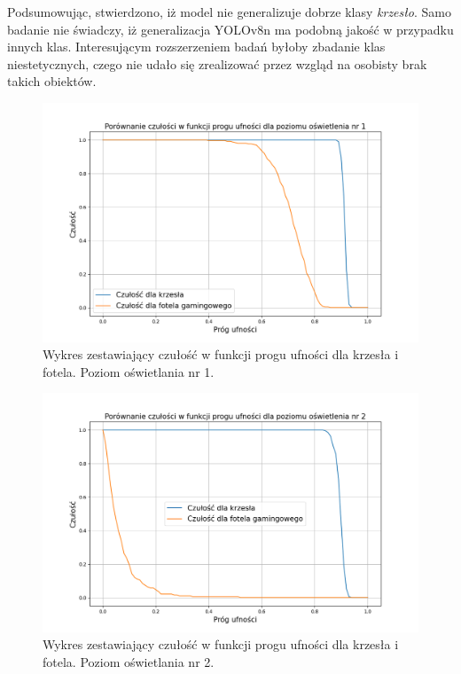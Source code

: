 Podsumowując, stwierdzono, iż model nie generalizuje dobrze klasy \emph{krzesło}. Samo badanie nie świadczy, iż generalizacja YOLOv8n ma podobną jakość w przypadku innych klas. Interesującym rozszerzeniem badań byłoby zbadanie klas niestetycznych, czego nie udało się zrealizować przez wzgląd na osobisty brak takich obiektów. 

\begin{figure}[H]
    \centering
    \includegraphics[width=\linewidth]{r_test_dokładności/chair_charts/1.png}
    \caption{Wykres zestawiający czułość w funkcji progu ufności dla krzesła i fotela. Poziom oświetlania nr 1.}
    \label{fig:chair-game-1}
\end{figure}

\begin{figure}[H]
    \centering
    \includegraphics[width=\linewidth]{r_test_dokładności/chair_charts/2.png}
    \caption{Wykres zestawiający czułość w funkcji progu ufności dla krzesła i fotela. Poziom oświetlania nr 2.}
    \label{fig:chair-game-2}
\end{figure}

